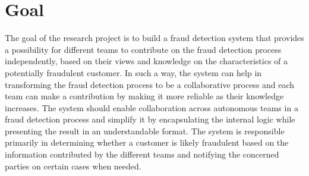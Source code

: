 \section{Goal}

  The goal of the research project is to build a fraud detection system that provides a possibility for different teams to contribute on the fraud detection process independently, based on their views and knowledge on the characteristics of a potentially fraudulent customer. In such a way, the system can help in transforming the fraud detection process to be a collaborative process and each team can make a contribution by making it more reliable as their knowledge increases. The system should enable collaboration across autonomous teams in a fraud detection process and simplify it by encapsulating the internal logic while presenting the result in an understandable format. The system is responsible primarily in determining whether a customer is likely fraudulent based on the information contributed by the different teams and notifying the concerned parties on certain cases when needed.